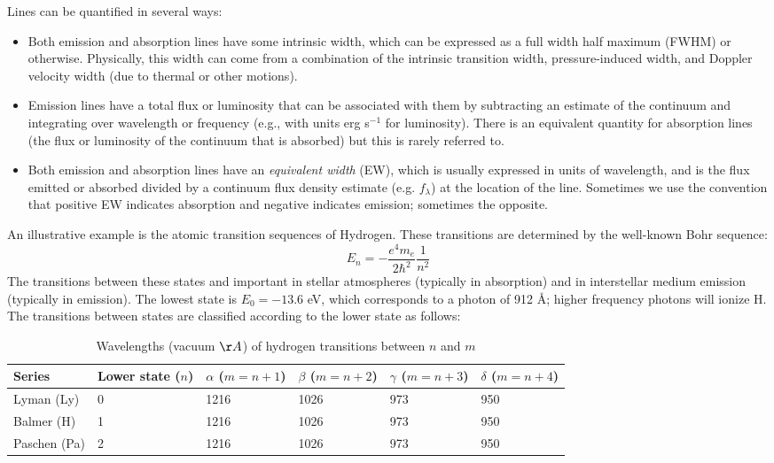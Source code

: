 Lines can be quantified in several ways:
\begin{itemize}
\item Both emission and absorption lines have some intrinsic width, which can
be expressed as a full width half maximum (FWHM) or
otherwise. Physically, this width can come from a combination of the
intrinsic transition width, pressure-induced width, and Doppler
velocity width (due to thermal or other motions).
\item Emission lines have a total flux or luminosity that can be associated
with them by subtracting an estimate of the continuum and integrating
over wavelength or frequency (e.g., with units erg s$^{-1}$ for
luminosity). There is an equivalent quantity for absorption lines (the
flux or luminosity of the continuum that is absorbed) but this is
rarely referred to.
\item Both emission and absorption lines  have an {\it equivalent
width} (EW), which is usually expressed in units of wavelength, and is
the flux emitted or absorbed divided by a continuum flux density
estimate (e.g. $f_\lambda$) at the location of the line. Sometimes we
use the convention that positive EW indicates absorption and negative
indicates emission; sometimes the opposite.
\end{itemize}

An illustrative example is the atomic transition sequences of
Hydrogen. These transitions are determined by the well-known Bohr
sequence:
\begin{equation}
E_n = - \frac{e^4m_e}{2\hbar^2} \frac{1}{n^2}
\end{equation}
The transitions between these states and important in stellar
atmospheres (typically in absorption) and in interstellar medium
emission (typically in emission). The lowest state is $E_0 = - 13.6$
eV, which corresponds to a photon of 912 \AA; higher frequency photons
will ionize H. The transitions between states are classified
according to the lower state as follows:

\begin{table}[htp]
\caption{
\label{table:hydrogen} Wavelengths (vacuum $\AA$) of hydrogen transitions between $n$ and $m$}
\begin{tabular}{llllll}
\hline\hline
Series & Lower state ($n$) & $\alpha$ ($m = n+1$) & $\beta$ ($m=n+2$)
& $\gamma$ ($m=n+3$) & $\delta$ ($m=n+4$) \\
\hline
Lyman (Ly) & 0 & 1216 & 1026	& 973	& 950 \\
Balmer (H) & 1 & 1216 & 1026	& 973	& 950 \\
Paschen (Pa) & 2 & 1216 & 1026	& 973	& 950 \\
\hline
\end{tabular}
\end{table}

